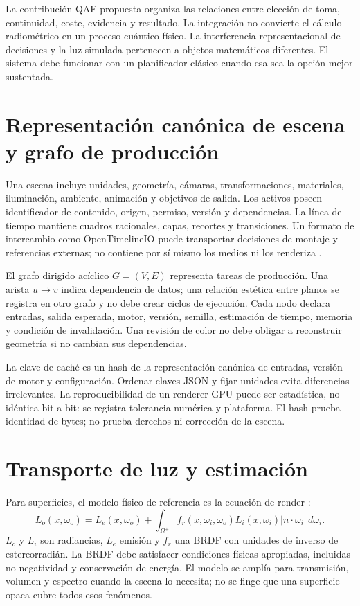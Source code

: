 La contribución QAF propuesta organiza las relaciones entre elección de toma, continuidad, coste, evidencia y resultado. La integración no convierte el cálculo radiométrico en un proceso cuántico físico. La interferencia representacional de decisiones y la luz simulada pertenecen a objetos matemáticos diferentes. El sistema debe funcionar con un planificador clásico cuando esa sea la opción mejor sustentada.

\section{Representación canónica de escena y grafo de producción}
Una escena incluye unidades, geometría, cámaras, transformaciones, materiales, iluminación, ambiente, animación y objetivos de salida. Los activos poseen identificador de contenido, origen, permiso, versión y dependencias. La línea de tiempo mantiene cuadros racionales, capas, recortes y transiciones. Un formato de intercambio como OpenTimelineIO puede transportar decisiones de montaje y referencias externas; no contiene por sí mismo los medios ni los renderiza \cite{otio}.

El grafo dirigido acíclico $G=(V,E)$ representa tareas de producción. Una arista $u\to v$ indica dependencia de datos; una relación estética entre planos se registra en otro grafo y no debe crear ciclos de ejecución. Cada nodo declara entradas, salida esperada, motor, versión, semilla, estimación de tiempo, memoria y condición de invalidación. Una revisión de color no debe obligar a reconstruir geometría si no cambian sus dependencias.

La clave de caché es un hash de la representación canónica de entradas, versión de motor y configuración. Ordenar claves JSON y fijar unidades evita diferencias irrelevantes. La reproducibilidad de un renderer GPU puede ser estadística, no idéntica bit a bit: se registra tolerancia numérica y plataforma. El hash prueba identidad de bytes; no prueba derechos ni corrección de la escena.

\section{Transporte de luz y estimación}
Para superficies, el modelo físico de referencia es la ecuación de render \cite{pbr}:
\begin{equation}
 L_o(x,\omega_o)=L_e(x,\omega_o)+\int_{\Omega^+}f_r(x,\omega_i,\omega_o)
 L_i(x,\omega_i)|n\cdot\omega_i|\,d\omega_i.
\end{equation}
$L_o$ y $L_i$ son radiancias, $L_e$ emisión y $f_r$ una BRDF con unidades de inverso de estereorradián. La BRDF debe satisfacer condiciones físicas apropiadas, incluidas no negatividad y conservación de energía. El modelo se amplía para transmisión, volumen y espectro cuando la escena lo necesita; no se finge que una superficie opaca cubre todos esos fenómenos.

